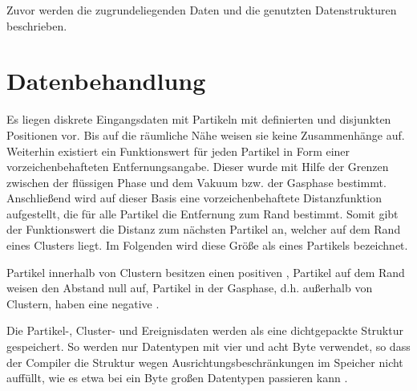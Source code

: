 Zuvor werden die zugrundeliegenden Daten und die genutzten Datenstrukturen beschrieben.

\section{Datenbehandlung}\label{sec:datenbehandlung}


Es liegen diskrete Eingangsdaten mit Partikeln mit definierten und disjunkten Positionen vor. Bis auf die räumliche Nähe weisen sie keine Zusammenhänge auf. Weiterhin existiert ein Funktionswert für jeden Partikel in Form einer vorzeichenbehafteten Entfernungsangabe. Dieser wurde mit Hilfe der Grenzen zwischen der flüssigen Phase und dem Vakuum bzw. der Gasphase bestimmt. Anschließend wird auf dieser Basis eine vorzeichenbehaftete Distanzfunktion aufgestellt, die für alle Partikel die Entfernung zum Rand bestimmt. Somit gibt der Funktionswert die Distanz zum nächsten Partikel an, welcher auf dem Rand eines Clusters liegt. Im Folgenden wird diese Größe als  eines Partikels bezeichnet.

Partikel innerhalb von Clustern besitzen einen positiven , Partikel auf dem Rand weisen den Abstand null auf, Partikel in der Gasphase, d.h. außerhalb von Clustern, haben eine negative .

Die Partikel-, Cluster- und Ereignisdaten werden als eine dichtgepackte Struktur gespeichert. So werden nur Datentypen mit vier und acht Byte verwendet, so dass der Compiler die Struktur wegen Ausrichtungsbeschränkungen im Speicher nicht auffüllt, wie es etwa bei ein Byte großen Datentypen passieren kann \cite{raymond1994cAlignment}. %

